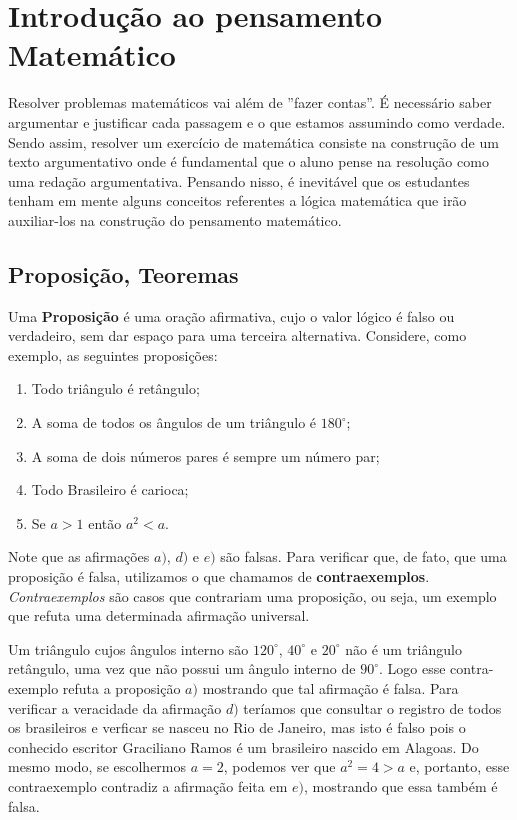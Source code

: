\chapter{Introdução ao pensamento Matemático}

Resolver problemas matemáticos vai além de ''fazer contas''. É necessário saber argumentar e justificar cada passagem e o que estamos assumindo como verdade. Sendo assim, resolver um exercício de matemática consiste na construção de um texto argumentativo onde é fundamental que o aluno pense na resolução como uma redação argumentativa. Pensando nisso, é inevitável que os estudantes tenham em mente alguns conceitos referentes a lógica matemática que irão auxiliar-los na construção do pensamento matemático.
\section{Proposição, Teoremas }
Uma \textbf{Proposição} é uma oração afirmativa, cujo o valor lógico é falso ou verdadeiro, sem dar espaço para uma terceira alternativa. Considere, como exemplo, as seguintes proposições:
\begin{exe}
\begin{enumerate}
    \item[a)] Todo triângulo é retângulo;
    \item[b)] A soma de todos os ângulos de um triângulo é $180^{\circ}$;
    \item[c)] A soma de dois números pares é sempre um número par;
    \item[d)] Todo Brasileiro é carioca;
    \item[e)] Se $a>1$ então $a^2<a$.
\end{enumerate}
\end{exe}
Note que as afirmações $a)$, $d)$ e $e)$ são falsas. Para verificar que, de fato, que uma proposição é falsa, utilizamos o que chamamos de \textbf{contraexemplos}. \textit{Contraexemplos} são casos que contrariam uma proposição, ou seja, um exemplo que refuta uma determinada afirmação universal.

Um triângulo cujos ângulos interno são $120^{\circ}$, $40^{\circ}$ e $20^{\circ}$ não é um triângulo retângulo, uma vez que não possui um ângulo interno de $90^{\circ}$. Logo esse contra-exemplo refuta a proposição $a)$ mostrando que tal afirmação é falsa. Para verificar a veracidade da afirmação $d)$ teríamos que consultar o registro de todos os brasileiros e verficar se nasceu no Rio de Janeiro,
mas isto é falso pois o conhecido escritor Graciliano Ramos é um
brasileiro nascido em Alagoas. Do mesmo modo, se escolhermos $a=2$, podemos ver que $a^2=4 > a$ e, portanto, esse contraexemplo contradiz a afirmação feita em $e)$, mostrando que essa também é falsa.

